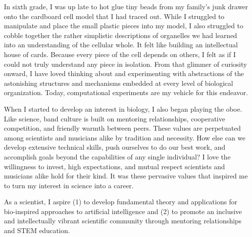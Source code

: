 In sixth grade, I was up late to hot glue tiny beads from my family's junk drawer onto the cardboard cell model that I had traced out.
While I struggled to manipulate and place the small plastic pieces into my model, I also struggled to cobble together the rather simplistic descriptions of organelles we had learned into an understanding of the cellular whole.
It felt like building an intellectual house of cards.
Because every piece of the cell depends on others, I felt as if I could not truly understand any piece in isolation.
From that glimmer of curiosity onward, I have loved thinking about and experimenting with abstractions of the astonishing structures and mechanisms embedded at every level of biological organization.
Today, computational experiments are my vehicle for this endeavor.

When I started to develop an interest in biology, I also began playing the oboe.
Like science, band culture is built on mentoring relationships, cooperative competition, and friendly warmth between peers.
These values are perpetuated among scientists and musicians alike by tradition and necessity.
How else can we develop extensive technical skills, push ourselves to do our best work, and accomplish goals beyond the capabilities of any single individual?
I love the willingness to invest, high expectations, and mutual respect scientists and musicians alike hold for their kind.
It was these pervasive values that inspired me to turn my interest in science into a career.

As a scientist, I aspire
(1) to develop fundamental theory and applications for bio-inspired approaches to artificial intelligence and
(2) to promote an inclusive and intellectually vibrant scientific community through mentoring relationships and STEM education.
